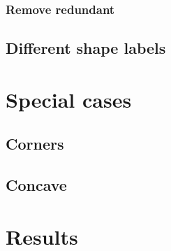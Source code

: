 \documentclass[a4paper]{article}
\begin{document}
\subsubsection{Remove redundant}
\subsection{Different shape labels}
\section{Special cases}
\subsection{Corners}
\subsection{Concave}

\section{Results}



{}

\end{document}
